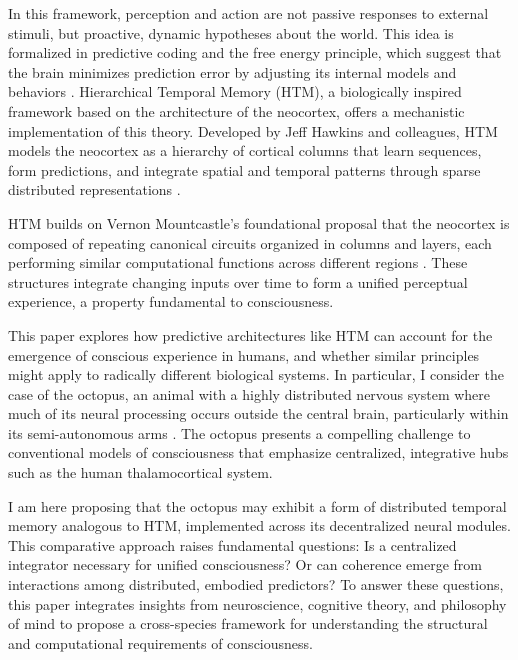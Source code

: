 \documentclass{article}
\begin{document}
In this framework, perception and action are not passive responses to external stimuli, but proactive, dynamic hypotheses about the world. This idea is formalized in predictive coding and the free energy principle, which suggest that the brain minimizes prediction error by adjusting its internal models and behaviors \parencite{friston2010free}. Hierarchical Temporal Memory (HTM), a biologically inspired framework based on the architecture of the neocortex, offers a mechanistic implementation of this theory. Developed by Jeff Hawkins and colleagues, HTM models the neocortex as a hierarchy of cortical columns that learn sequences, form predictions, and integrate spatial and temporal patterns through sparse distributed representations \parencite{hawkins2017theory, hawkins2016why, ahmad2015properties}.

HTM builds on Vernon Mountcastle’s foundational proposal that the neocortex is composed of repeating canonical circuits organized in columns and layers, each performing similar computational functions across different regions \parencite{mountcastle1997columnar,mountcastle1998perceptual}. These structures integrate changing inputs over time to form a unified perceptual experience, a property fundamental to consciousness.

This paper explores how predictive architectures like HTM can account for the emergence of conscious experience in humans, and whether similar principles might apply to radically different biological systems. In particular, I consider the case of the octopus, an animal with a highly distributed nervous system where much of its neural processing occurs outside the central brain, particularly within its semi-autonomous arms \parencite{carls2022where, mather2021octopus, huffard2013cephalopod}. The octopus presents a compelling challenge to conventional models of consciousness that emphasize centralized, integrative hubs such as the human thalamocortical system.

I am here proposing that the octopus may exhibit a form of distributed temporal memory analogous to HTM, implemented across its decentralized neural modules. This comparative approach raises fundamental questions: Is a centralized integrator necessary for unified consciousness? Or can coherence emerge from interactions among distributed, embodied predictors? To answer these questions, this paper integrates insights from neuroscience, cognitive theory, and philosophy of mind to propose a cross-species framework for understanding the structural and computational requirements of consciousness.
\newpage
\end{document}
